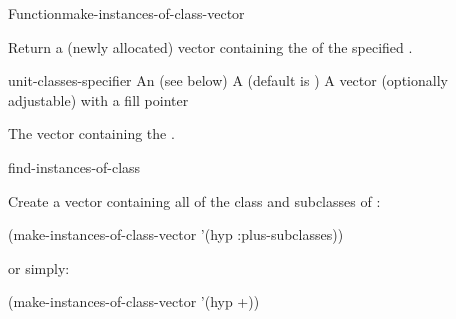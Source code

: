 \documentclass[10pt,twoside,english,pdftex]{article}
\begin{document}

\begin{functiondoc}{Function}{make-instances-of-class-vector}%
  {
    }

%
%

\fnsyntax

\fnpurpose Return a (newly allocated) vector containing the
 of the specified .

\fnpackage {}

\fnmodule {}

\fnargs
\begin{args}{unit-classes-specifier}
 An 
(see below)
\arg[adjustable] A  (default is \nil)
\arg[vector] A vector (optionally adjustable) with a fill pointer
\end{args}

\fnreturns The vector containing the .

\fndsyntax
\W\supp\tabletop
\unitclassesspec
\subclassingspec

\begin{alsos}{find-instances-of-class}
\end{alsos}

\fnexample
Create a vector containing all  of the class 
and subclasses of :
%
\W\supp
\begin{example}
  (make-instances-of-class-vector '(hyp :plus-subclasses))
\end{example} 
%
or simply:
%
\W\supp\notpretop
\begin{example}
  (make-instances-of-class-vector '(hyp +))
\end{example} 

\end{functiondoc}

\end{document}
